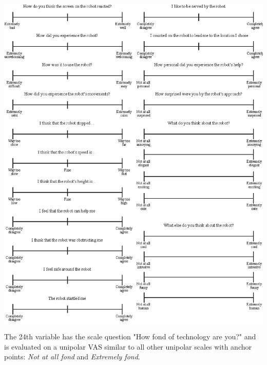 \documentclass[paperwidth=160cm,paperheight=100cm,landscape,fontscale=0.2941]{baposter}
\begin{document}
\begin{poster}
{\begin{center}
	\includegraphics[width=1.0\linewidth]{AllScalesSpace.eps}

\end{center}
\vspace{10pt}
The 24th variable has the scale question "How fond of technology are you?" and is evaluated on a unipolar VAS similar to all other unipolar scales with anchor points: \textit{Not at all fond} and \textit{Extremely fond}.
}




\end{poster}
\end{document}
